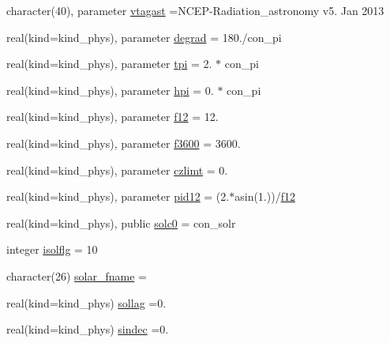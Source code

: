 \begin{DoxyCompactItemize}
\item 
character(40), parameter \hyperlink{namespacemodule__radiation__astronomy_aa3497dc9fa4bbd8248fdf0f2784c268a}{vtagast} =\textquotesingle{}N\+C\+EP-\/Radiation\+\_\+astronomy v5. Jan 2013 \textquotesingle{}
\item 
real(kind=kind\+\_\+phys), parameter \hyperlink{namespacemodule__radiation__astronomy_a220d2b997b3073cf2985d62111c5405d}{degrad} = 180./con\+\_\+pi
\item 
real(kind=kind\+\_\+phys), parameter \hyperlink{namespacemodule__radiation__astronomy_a4fbf4be04e17f1f8d0674ee2e20506b0}{tpi} = 2. $\ast$ con\+\_\+pi
\item 
real(kind=kind\+\_\+phys), parameter \hyperlink{namespacemodule__radiation__astronomy_a7369d8561566f5e7e51ccc40e09f2520}{hpi} = 0. $\ast$ con\+\_\+pi
\item 
real(kind=kind\+\_\+phys), parameter \hyperlink{namespacemodule__radiation__astronomy_ad59856e8f877eb05a6b22610f14a391d}{f12} = 12.
\item 
real(kind=kind\+\_\+phys), parameter \hyperlink{namespacemodule__radiation__astronomy_a37b491dde50d06e339effb4a31d9f245}{f3600} = 3600.
\item 
real(kind=kind\+\_\+phys), parameter \hyperlink{namespacemodule__radiation__astronomy_afeb2fccbe8137de6099a09035762ff5e}{czlimt} = 0.
\item 
real(kind=kind\+\_\+phys), parameter \hyperlink{namespacemodule__radiation__astronomy_adbf9cdfc7b55d882f015a4bc4ef276ab}{pid12} = (2.$\ast$asin(1.))/\hyperlink{namespacemodule__radiation__astronomy_ad59856e8f877eb05a6b22610f14a391d}{f12}
\item 
real(kind=kind\+\_\+phys), public \hyperlink{namespacemodule__radiation__astronomy_a37e08872f67023b11f839ac15151af09}{solc0} = con\+\_\+solr
\item 
integer \hyperlink{namespacemodule__radiation__astronomy_a7ea431b6d4f4d6ee1f6545d6baeee44f}{isolflg} = 10
\item 
character(26) \hyperlink{namespacemodule__radiation__astronomy_a05ee7e378d38b90242738b9bf6c40c00}{solar\+\_\+fname} = \textquotesingle{} \textquotesingle{}
\item 
real(kind=kind\+\_\+phys) \hyperlink{namespacemodule__radiation__astronomy_a264a011aa71fb670339ac555dc24e486}{sollag} =0.
\item 
real(kind=kind\+\_\+phys) \hyperlink{namespacemodule__radiation__astronomy_ae195d9c834e2789170f89c988d28b01e}{sindec} =0.

\end{DoxyCompactItemize}
